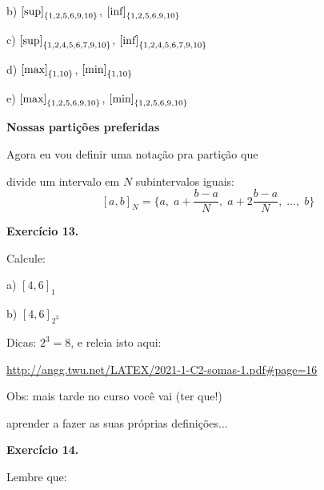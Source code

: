 \documentclass[oneside,12pt]{article}
\begin{document}
\ssk

b) $\text{[sup]}_{\{1,2,5,6,9,10\}}$, 
   $\text{[inf]}_{\{1,2,5,6,9,10\}}$

\ssk

c) $\text{[sup]}_{\{1,2,4,5,6,7,9,10\}}$, 
   $\text{[inf]}_{\{1,2,4,5,6,7,9,10\}}$

\bsk

d) $\text{[max]}_{\{1,10\}}$, 
   $\text{[min]}_{\{1,10\}}$

\ssk

e) $\text{[max]}_{\{1,2,5,6,9,10\}}$, 
   $\text{[min]}_{\{1,2,5,6,9,10\}}$



\newpage


{\bf Nossas partições preferidas}

Agora eu vou definir uma notação pra partição que

divide um intervalo em $N$ subintervalos iguais:
%
\def\baN{\frac{b-a}{N}}
%
$$
  \textstyle
  [a,b]_N = \{a, \; a+\baN, \; a+2\baN, \; \ldots, \; b\}
$$

\msk

{\bf Exercício 13.}

Calcule:

a) $[4,6]_1$

b) $[4,6]_{2^3}$

\msk

Dicas: $2^3=8$, e releia isto aqui:

\ssk

{\footnotesize

\url{http://angg.twu.net/LATEX/2021-1-C2-somas-1.pdf\#page=16}

}

\bsk


Obs: mais tarde no curso você vai (ter que!)

aprender a fazer as suas próprias definições...

\newpage


{\bf Exercício 14.}

Lembre que:

\bsk
\end{document}
